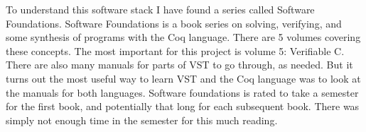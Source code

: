 To understand this software stack I have found a series called Software Foundations. Software Foundations is a book series on solving, verifying, and some synthesis of programs with the Coq language. \cite{noauthor_software_nodate} There are 5 volumes covering these concepts. The most important for this project is volume 5: Verifiable C. There are also many manuals for parts of VST to go through, as needed. But it turns out the most useful way to learn VST and the Coq language was to look at the manuals for both languages. Software foundations is rated to take a semester for the first book, and potentially that long for each subsequent book. There was simply not enough time in the semester for this much reading.
